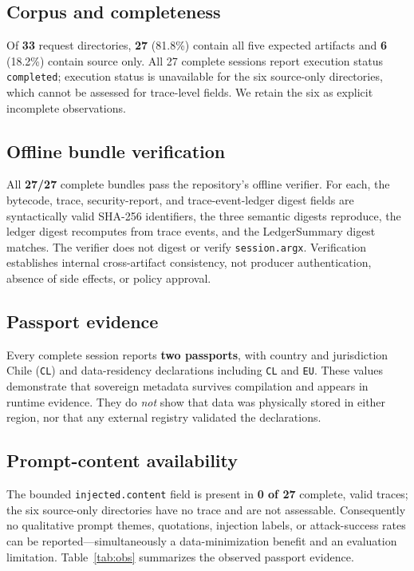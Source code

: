 \documentclass[conference]{IEEEtran}
\newcommand{\code}[1]{\texttt{\small #1}}
\begin{document}
\subsection{Corpus and completeness}
Of \textbf{33} request directories, \textbf{27} (81.8\%) contain all five
expected artifacts and \textbf{6} (18.2\%) contain source only. All 27 complete
sessions report execution status \code{completed}; execution status is
unavailable for the six source-only directories, which cannot be assessed for
trace-level fields. We retain the six as explicit incomplete observations.

\subsection{Offline bundle verification}
All \textbf{27/27} complete bundles pass the repository's offline verifier. For
each, the bytecode, trace, security-report, and trace-event-ledger digest fields
are syntactically valid SHA-256 identifiers, the three semantic digests
reproduce, the ledger digest recomputes from trace events, and the LedgerSummary
digest matches. The verifier does not digest or verify \code{session.argx}.
Verification establishes internal cross-artifact consistency, not producer
authentication, absence of side effects, or policy approval.

\subsection{Passport evidence}
Every complete session reports \textbf{two passports}, with country and
jurisdiction Chile (\code{CL}) and data-residency declarations including
\code{CL} and \code{EU}. These values demonstrate that sovereign metadata
survives compilation and appears in runtime evidence. They do \emph{not} show
that data was physically stored in either region, nor that any external registry
validated the declarations.

\subsection{Prompt-content availability}
The bounded \code{injected.content} field is present in \textbf{0 of 27}
complete, valid traces; the six source-only directories have no trace and are not
assessable. Consequently no qualitative prompt themes, quotations, injection
labels, or attack-success rates can be reported---simultaneously a
data-minimization benefit and an evaluation limitation. Table~\ref{tab:obs}
summarizes the observed passport evidence.
\end{document}
